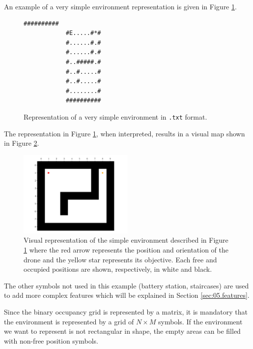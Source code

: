 An example of a very simple environment representation is given in Figure \ref{fig:05.simple.environment.representation.txt}.

\begin{figure}[H]
    \centering
    \begin{minipage}[t]{0.135\textwidth}
        \begin{lstlisting}[style=defaultFrameTBNumber, gobble=12]
            ##########
            #E.....#*#
            #......#.#
            #......#.#
            #..#####.#
            #..#.....#
            #..#.....#
            #........#
            ##########
        \end{lstlisting}
    \end{minipage}
    \caption{Representation of a very simple environment in \texttt{.txt} format.}
    \label{fig:05.simple.environment.representation.txt}
\end{figure}

The representation in Figure \ref{fig:05.simple.environment.representation.txt}, when interpreted, results in a visual map shown in Figure \ref{fig:05.simple.environment.visual}.

\begin{figure}[H]
    \centering
    \includegraphics[width=0.5\textwidth]{resources/pdf/05/simple-environment/map.pdf}
    \caption{Visual representation of the simple environment described in Figure \ref{fig:05.simple.environment.representation.txt} where the red arrow represents the position and orientation of the drone and the yellow star represents its objective. Each free and occupied positions are shown, respectively, in white and black.}
    \label{fig:05.simple.environment.visual}
\end{figure}

The other symbols not used in this example (battery station, staircases) are used to add more complex features which will be explained in Section \ref{sec:05.features}.

\begin{note}
    Since the binary occupancy grid is represented by a matrix, it is mandatory that the environment is represented by a grid of $N \times M$ symbols. If the environment we want to represent is not rectangular in shape, the empty areas can be filled with non-free position symbols.
\end{note}

